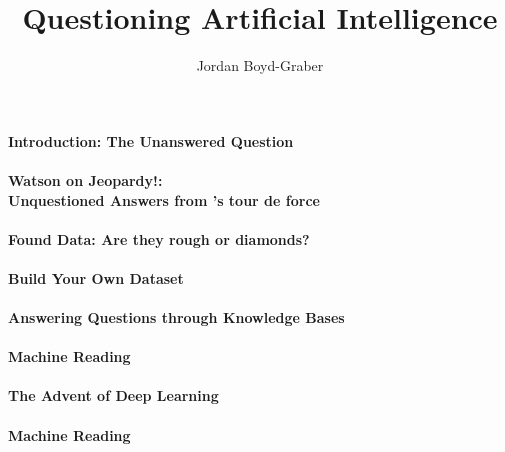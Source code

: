 \documentclass[bfivepaper,twosided,justified,nobib]{style/tufte-book}
\title{Questioning Artificial Intelligence}
\author{Jordan Boyd-Graber}
\newif\ifproposal\proposaltrue
\newcommand{\proposalpart}[1]{
  \ifproposal
  \subsection{#1}
  \else
  \part{#1}
  \fi
}
\newcommand{\chapterfile}[3]{
  \ifproposal
  \paragraph{#3}
  
  \else
  \chapter{#3}
  \label{ch:#1}
  \begin{quote}
    
  \end{quote}
  
  \fi}
\begin{document}
\setcounter{secnumdepth}{0}

\ifproposal

\else

\tableofcontents

\fi








\chapterfile{010}{introduction}{Introduction: The Unanswered Question}

\ifproposal

\fi


\ifproposal

\else



\clearpage


\proposalpart{Question Answering Past}


\chapterfile{110}{epic}{The Mythic Roots of Question Answering}

\chapterfile{120}{civilization}{How Question Answering Saved Civilization}





\chapterfile{130}{turing}{The Turing Test: A Game Show Pitch that
  Defined Artificial Intelligence}

\chapterfile{140}{ir}{The Cranfield Paradigm: How a University with an
  Airstrip made Google Possible}

\proposalpart{Question Answering Present}

\chapterfile{200}{formats}{The Computers' Ways of Asking}

\chapterfile{240}{qb}{The Manchester Paradigm: The Art of Asking the
  Perfect Question}
\fi

\chapterfile{250}{watson}{Watson on Jeopardy!: \\ Unquestioned Answers from \abr{ibm}'s tour de force}

  \ifproposal

  \else
  
\chapterfile{260}{datasets_found}{Found  Data: Are they rough
  or diamonds?}
\chapterfile{262}{datasets_constructed}{Build Your Own Dataset}

\chapterfile{270}{methods_kb}{Answering Questions through Knowledge
  Bases}
\chapterfile{271}{methods_mr}{Machine Reading}
\chapterfile{272}{methods_deep_retrieval}{The Advent of Deep Learning}
\chapterfile{273}{methods_generation}{Machine Reading}
\end{document}
